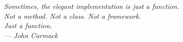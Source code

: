 \thispagestyle{empty}

\vspace*{\baselineskip}
{\raggedleft \itshape Sometimes, the elegant implementation is just a
  function.\\
  Not a method. Not a class. Not a framework.\\
  Just a function.\\
  --- John Carmack\\
}
\newpage

